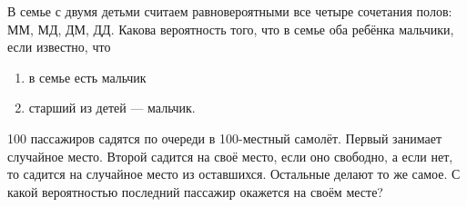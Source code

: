\documentclass{article}
\begin{document}
\begin{enumerate_boxed}
        \item В семье с двумя детьми считаем равновероятными все четыре сочетания полов: ММ, МД, ДМ, ДД.
        Какова вероятность того, что в семье оба ребёнка мальчики, если известно, что
        \begin{enumerate}
            \item в семье есть мальчик
            \item старший из детей — мальчик.
        \end{enumerate}

        \item 100 пассажиров садятся по очереди в 100-местный самолёт.
        Первый занимает случайное место.
        Второй садится на своё место, если оно свободно, а если нет, то садится на случайное место из оставшихся.
        Остальные делают то же самое.
        С какой вероятностью последний пассажир окажется на своём месте?

    \end{enumerate_boxed}
\end{document}

